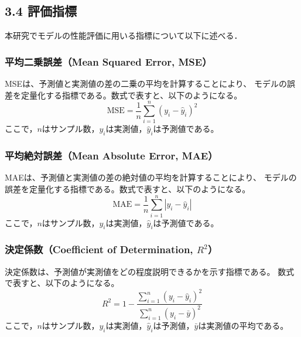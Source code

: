 \subsection*{3.4 評価指標}
本研究でモデルの性能評価に用いる指標について以下に述べる．

\subsubsection*{平均二乗誤差（Mean Squared Error, MSE）}
MSEは、予測値と実測値の差の二乗の平均を計算することにより、
モデルの誤差を定量化する指標である。数式で表すと、以下のようになる。
\begin{equation}
  \label{eq:mse}
  \mathrm{MSE} = \frac{1}{n} \sum_{i=1}^{n} (y_i - \hat{y}_i)^2
\end{equation}
ここで，$n$はサンプル数，$y_i$は実測値，$\hat{y}_i$は予測値である。

\subsubsection*{平均絶対誤差（Mean Absolute Error, MAE）}
MAEは、予測値と実測値の差の絶対値の平均を計算することにより、
モデルの誤差を定量化する指標である。数式で表すと、以下のようになる。
\begin{equation}
  \label{eq:mae}
  \mathrm{MAE} = \frac{1}{n} \sum_{i=1}^{n} |y_i - \hat{y}_i|
\end{equation}
ここで，$n$はサンプル数，$y_i$は実測値，$\hat{y}_i$は予測値である。

\subsubsection*{決定係数（Coefficient of Determination, $R^2$）}
決定係数は、予測値が実測値をどの程度説明できるかを示す指標である。  
数式で表すと、以下のようになる。
\begin{equation}
  \label{eq:r2}
  R^2 = 1 - \frac{\sum_{i=1}^{n} (y_i - \hat{y}_i)^2}{\sum_{i=1}^{n} (y_i - \bar{y})^2}
\end{equation}
ここで，$n$はサンプル数，$y_i$は実測値，$\hat{y}_i$は予測値，$\bar{y}$は実測値の平均である。